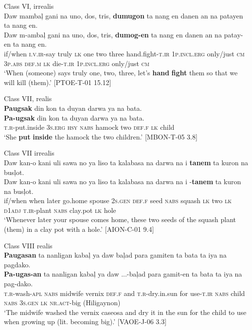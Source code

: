 \newpage
\ea
Class VI, irrealis \\
Daw  mambaļ  gani  na  uno,  dos,  tris,   \textbf{dumugon}  ta nang  en  danen  an  na  patayen  ta  nang  en. \\\smallskip
\gll Daw  m-ambaļ  gani  na  uno,  dos,  tris,   \textbf{dumog-en}  ta nang  en  danen  an  na  patay-en  ta  nang  en. \\
if/when  \textsc{i.v.ir}-say  truly  \textsc{lk}  one  two  three  hand.fight-\textsc{t.ir}  1\textsc{p.incl.erg}
only/just  \textsc{cm}  3\textsc{p.abs}  \textsc{def.m}  \textsc{lk}  die-\textsc{t.ir}  1\textsc{p.incl.erg}  only/just  \textsc{cm} \\
\glt ‘When (someone) says truly one, two, three, let’s \textbf{hand} \textbf{fight} them so that we will kill (them).’ [PTOE-T-01 15.12]
\z

\ea
Class VII, realis \\
\textbf{Paugsak}  din  kon  ta  duyan  darwa  ya  na  bata. \\\smallskip
\gll \textbf{Pa-ugsak}  din  kon  ta  duyan  darwa  ya  na  bata. \\
\textsc{t.r}-put.inside  3\textsc{s.erg}  \textsc{hsy}  \textsc{nabs}  hamock  two  \textsc{def.f}  \textsc{lk}  child \\
\glt ‘She \textbf{put} \textbf{inside} the hamock the two children.’ [MBON-T-05 3.8]
\z

\ea
Class VII irrealis \\
Daw  kan-o  kani  uli  sawa  no  ya  liso  ta  kalabasa  na darwa  na i  \textbf{tanem}  ta  kuron  na  busļot. \\\smallskip
\gll Daw  kan-o  kani  uli  sawa  no  ya  liso  ta  kalabasa  na darwa  na i  \emptyset{}-\textbf{tanem}  ta  kuron  na  busļot. \\
if/when  when  later  go.home  spouse  2\textsc{s.gen}  \textsc{def.f}  seed  \textsc{nabs}  squash  \textsc{lk}
two  \textsc{lk} \textsc{d}1\textsc{adj}  \textsc{t.ir}-plant  \textsc{nabs}  clay.pot  \textsc{lk}  hole \\
\glt ‘Whenever later your spouse comes home, these two seeds of the squash plant (them) in a clay pot with a hole.’ [AION-C-01 9.4]
\z

\ea
Class VIII realis \\
\textbf{Paugasan}  ta  nanligan  kabaļ  ya  daw  baļad  para gamiten  ta  bata  ta  iya  na  pagdako. \\\smallskip
\gll \textbf{Pa-ugas-an}  ta  nanligan  kabaļ  ya  daw  ...-baļad  para gamit-en  ta  bata  ta  iya  na  pag-dako. \\
\textsc{t.r}-wash-\textsc{apl}  \textsc{nabs}  midwife  vernix  \textsc{def.f}  and  \textsc{t.r}-dry.in.sun  for
use-\textsc{t.ir}  \textsc{nabs}  child  \textsc{nabs}  3\textsc{s.gen}  \textsc{lk}  \textsc{nr.act}-big (Hiligaynon) \\
\glt ‘The midwife washed the vernix caseosa and dry it in the sun for the child to use when growing up (lit. becoming big).’ [VAOE-J-06 3.3]
\z

